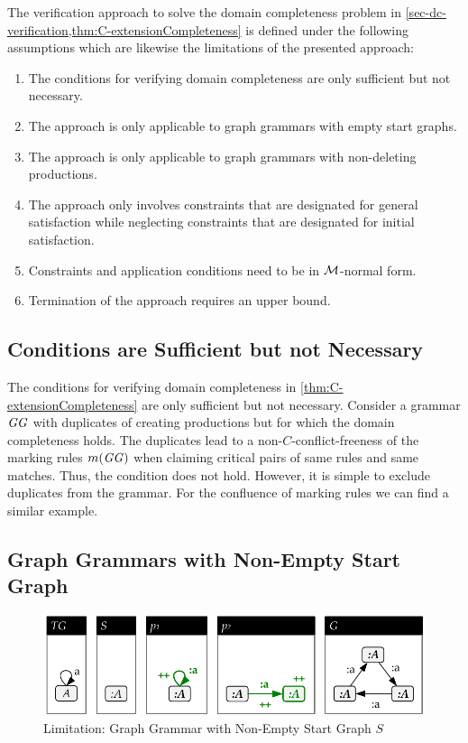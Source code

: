 The verification approach to solve the domain completeness problem in \cref{sec-dc-verification,thm:C-extensionCompleteness} is defined under the following assumptions which are likewise the limitations of the presented approach:

\begin{enumerate}
  \item The conditions for verifying domain completeness are only sufficient but not necessary.
  \item The approach is only applicable to graph grammars with empty start graphs.
  \item The approach is only applicable to graph grammars with non-deleting productions.
  \item The approach only involves constraints that are designated for general satisfaction while neglecting constraints that are designated for initial satisfaction.
  \item Constraints and application conditions need to be in ${\cal M}$-normal form.
  \item Termination of the approach requires an upper bound.
\end{enumerate}

\subsection{Conditions are Sufficient but not Necessary}

The conditions for verifying domain completeness in \cref{thm:C-extensionCompleteness} are only sufficient but not necessary.
Consider a grammar $\mathit{GG}$ with duplicates of creating productions but for which the domain completeness holds.
The duplicates lead to a non-$C$-conflict-freeness of the marking rules $m(\mathit{GG})$ when claiming critical pairs of same rules and same matches.
Thus, the condition does not hold.
However, it is simple to exclude duplicates from the grammar.
For the confluence of marking rules we can find a similar example.

\subsection{Graph Grammars with Non-Empty Start Graph}

\begin{figure}[!tb]
\begin{center}
\includegraphics[width=.68\textwidth]{img/limitations/startgraph.pdf}
\end{center}
\caption{Limitation: Graph Grammar with Non-Empty Start Graph $S$}
\label{fig:sec-dc-general-lim:startgraph}
\end{figure}


